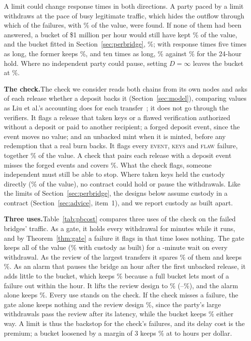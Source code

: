\documentclass[conference,compsoc]{IEEEtran}
\numberwithin{equation}{section}
\theoremstyle{plain}
\theoremstyle{definition}
\theoremstyle{remark}
\newcommand{\runin}[1]{\par\smallskip\noindent\textbf{#1.}\enspace}
\newcommand{\cev}{\textsc{event}}
\newcommand{\ckeys}{\textsc{keys}}
\newcommand{\ccheck}{\textsc{flaw}}
\begin{document}
A limit could change response times in both directions. A party paced by a limit withdraws at the pace of busy legitimate traffic, which hides the outflow through which \outflowDetectedN{} of the \nEvents{} failures, with \outflowDetectedValuePct\% of the value, were found. If none of them had been answered, a bucket of \$1 million per hour would still have kept \rtRampOutflowPct\% of the value, and the bucket fitted in Section~\ref{sec:perbridge}, \pbBucketOutflowPct\%; with response times five times as long, the former keeps \rtRampFivePct\%, and ten times as long, \rtRampTenPct\% against \rtHoldTenPct\% for the 24-hour hold. Where no independent party could pause, setting $D = \infty$ leaves the bucket at \rtRampNoPausePct\%.

\runin{The check}The check we consider reads both chains from its own nodes and asks of each release whether a deposit backs it (Section~\ref{sec:model}), comparing values as Liu et al.'s accounting does for each transfer~\cite{liu2024monte}; it does not go through the verifiers. It flags a release that taken keys or a flawed verification authorized without a deposit or paid to another recipient; a forged deposit event, since the event moves no value; and an unbacked mint when it is minted, before any redemption that a real burn backs. It flags every \cev{}, \ckeys{} and \ccheck{} failure, together \checkSeesPct\% of the value. A check that pairs each release with a deposit event misses the forged events and covers \checkMatchSeesPct\%. What the check flags, someone independent must still be able to stop. Where taken keys held the custody directly (\checkKeysHeldVPct\% of the value), no contract could hold or pause the withdrawals. Like the limits of Section~\ref{sec:perbridge}, the designs below assume custody in a contract (Section~\ref{sec:advice}, item~1), and we report custody as built apart.



\runin{Three uses}Table~\ref{tab:pbcost} compares three uses of the check on the failed bridges' traffic. As a gate, it holds every withdrawal for \pbGateMin{} minutes while it runs, and by Theorem~\ref{thm:gate} a failure it flags in that time loses nothing. The gate keeps all of the value (\pbGateBuiltPct\% with custody as built) for a \pbGateMin{}-minute wait on every withdrawal. As the review of the largest transfers it spares \pbReviewSparePct\% of them and keeps \pbReviewPctR\%. As an alarm that pauses the bridge an hour after the first unbacked release, it adds little to the bucket, which keeps \pbBucketAlarmHourPct\% because a full bucket lets most of a failure out within the hour. It lifts the review design to \pbReviewAlarmHourPct\% (\pbReviewAlarmHourLoPct--\pbReviewAlarmHourHiPct\%), and the alarm alone keeps \pbAlarmOnlyHourPct\%. Every use stands on the check. If the check misses a failure, the gate alone keeps nothing and the review design \pbReviewCheckFailsPct\%, since the party's large withdrawals pass the review after its latency, while the bucket keeps \pbBucketPctR\% either way. A limit is thus the backstop for the check's failures, and its delay cost is the premium; a bucket loosened by a margin of 3 keeps \pbLoosePct\% at \pbLooseHoursPerDollar{} to \pbLooseHoursPerDollarTwo{} hours per dollar.
\end{document}
